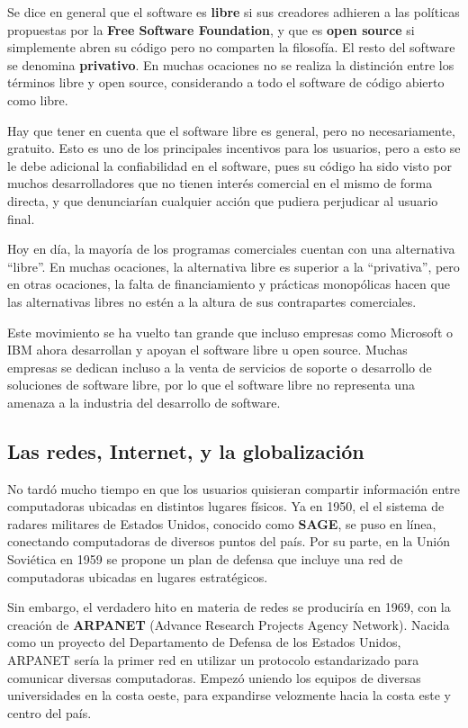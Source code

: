 Se dice en general que el software es \textbf{libre} si sus creadores adhieren
a las políticas propuestas por la \textbf{Free Software Foundation}, y que es
\textbf{open source} si simplemente abren su código pero no comparten la filosofía.
El resto del software se denomina \textbf{privativo}. En muchas ocaciones no se
realiza la distinción entre los términos libre y open source, considerando a
todo el software de código abierto como libre.

Hay que tener en cuenta que el software libre es general, pero no necesariamente,
gratuito. Esto es uno de los principales incentivos para los usuarios, pero a esto
se le debe adicional la confiabilidad en el software, pues su código ha sido
visto por muchos desarrolladores que no tienen interés comercial en el mismo de
forma directa, y que denunciarían cualquier acción que pudiera perjudicar al
usuario final.

Hoy en día, la mayoría de los programas comerciales cuentan con una alternativa
``libre''. En muchas ocaciones, la alternativa libre es superior a la ``privativa'',
pero en otras ocaciones, la falta de financiamiento y prácticas monopólicas
hacen que las alternativas libres no estén a la altura de sus contrapartes
comerciales.

Este movimiento se ha vuelto tan grande que incluso empresas como Microsoft o
IBM ahora desarrollan y apoyan el software libre u open source. Muchas empresas
se dedican incluso a la venta de servicios de soporte o desarrollo de soluciones
de software libre, por lo que el software libre no representa una amenaza a la
industria del desarrollo de software.

\subsection{Las redes, Internet, y la globalización}

No tardó mucho tiempo en que los usuarios quisieran compartir información entre
computadoras ubicadas en distintos lugares físicos. Ya en 1950, el el sistema de
radares militares de Estados Unidos, conocido como \textbf{SAGE}, se puso en
línea, conectando computadoras de diversos puntos del país. Por su parte, en la Unión Soviética
en 1959 se propone un plan de defensa que incluye una red de computadoras
ubicadas en lugares estratégicos.

Sin embargo, el verdadero hito en materia de redes se produciría en 1969, con la creación de
\textbf{ARPANET} (Advance Research Projects Agency Network). Nacida como un
proyecto del Departamento de Defensa de los Estados Unidos, ARPANET sería la
primer red en utilizar un protocolo estandarizado para comunicar diversas
computadoras. Empezó uniendo los equipos de diversas universidades en la
costa oeste, para expandirse velozmente hacia la costa este y centro del país.


